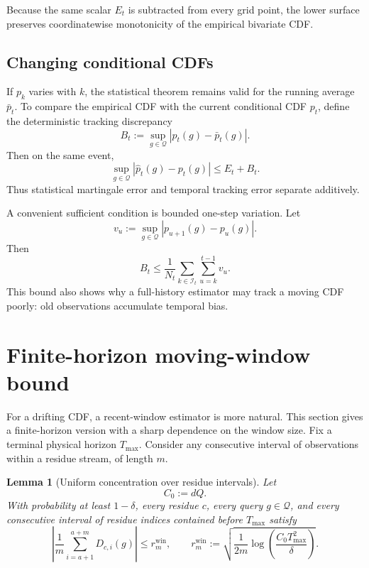 \documentclass[11pt]{article}
\newtheorem{lemma}[theorem]{Lemma}
\newcommand{\Q}{\mathcal{Q}}
\newcommand{\I}{\mathcal{I}}
\newcommand{\1}{\mathbf{1}}
\begin{document}
Because the same scalar $E_t$ is subtracted from every grid point, the lower
surface preserves coordinatewise monotonicity of the empirical bivariate CDF.

\subsection{Changing conditional CDFs}

If $p_k$ varies with $k$, the statistical theorem remains valid for the running
average $\bar p_t$.  To compare the empirical CDF with the current conditional
CDF $p_t$, define the deterministic tracking discrepancy
\begin{equation}
    B_t
    :=
    \sup_{g\in\Q}
    \left|p_t(g)-\bar p_t(g)\right|.
    \label{eq:tracking-Bt}
\end{equation}
Then on the same event,
\begin{equation}
    \sup_{g\in\Q}
    \left|
        \widehat p_t(g)-p_t(g)
    \right|
    \le
    E_t+B_t.
    \label{eq:current-decomp}
\end{equation}
Thus statistical martingale error and temporal tracking error separate
additively.

A convenient sufficient condition is bounded one-step variation.  Let
\begin{equation}
    v_u
    :=
    \sup_{g\in\Q}
    |p_{u+1}(g)-p_u(g)|.
    \label{eq:variation-vu}
\end{equation}
Then
\begin{equation}
    B_t
    \le
    \frac1{N_t}
    \sum_{k\in\I_t}
    \sum_{u=k}^{t-1}v_u.
    \label{eq:variation-full-history}
\end{equation}
This bound also shows why a full-history estimator may track a moving CDF
poorly: old observations accumulate temporal bias.

\section{Finite-horizon moving-window bound}

For a drifting CDF, a recent-window estimator is more natural.  This section
gives a finite-horizon version with a sharp dependence on the window size.
Fix a terminal physical horizon $T_{\max}$.  Consider any consecutive interval
of observations within a residue stream, of length $m$.

\begin{lemma}[Uniform concentration over residue intervals]
\label{lem:interval}
Let
\[
    C_0:=dQ.
\]
With probability at least $1-\delta$, every residue $c$, every query $g\in\Q$,
and every consecutive interval of residue indices contained before
$T_{\max}$ satisfy
\begin{equation}
    \left|
        \frac1m\sum_{i=a+1}^{a+m}D_{c,i}(g)
    \right|
    \le
    r_m^{\mathrm{win}},
    \qquad
    r_m^{\mathrm{win}}
    :=
    \sqrt{
        \frac1{2m}
        \log\!\left(
            \frac{C_0T_{\max}^2}{\delta}
        \right)
    }.
    \label{eq:window-radius}
\end{equation}
\end{lemma}
\end{document}
